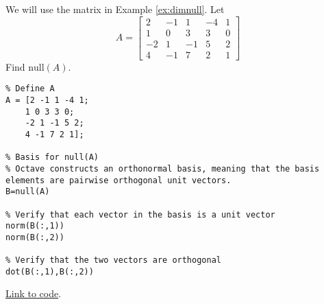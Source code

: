 \documentclass{ximera}
\begin{document}
\begin{template}
    We will use the matrix in Example \ref{ex:dimnull}.  Let 
$$A=\begin{bmatrix}2&-1&1&-4&1\\1&0&3&3&0\\-2&1&-1&5&2\\4&-1&7&2&1\end{bmatrix}$$
Find $\mbox{null}(A)$.

\begin{verbatim}
% Define A
A = [2 -1 1 -4 1;
    1 0 3 3 0;
    -2 1 -1 5 2;
    4 -1 7 2 1];

% Basis for null(A)
% Octave constructs an orthonormal basis, meaning that the basis elements are pairwise orthogonal unit vectors.
B=null(A)

% Verify that each vector in the basis is a unit vector
norm(B(:,1))
norm(B(:,2))

% Verify that the two vectors are orthogonal
dot(B(:,1),B(:,2))
\end{verbatim}

\href{https://sagecell.sagemath.org/?z=eJxtjkFLxDAUhO-B_Ie5LLTQyqauLCh7aPHuzYt4iPV1G2hfJEl38d-b2Kg9mITAm2S-mR0eaTBMaKVoccJLg1pBoT5APUiBuBT2uI17n-e6Se8Kd2iyckjjEVF_jYoUO3TaG4_BOvAyTUVbJvGpD_pC6C374JY-eGiGdWG0bN2sJ7wlV4WZNBs-I4w6xItWHTTRTJxcjvChjbsaT6v_bDnaFzYBF-qDdf5Giu70m53Sn8mZ4XOFku7H_BOGNxnx6C1HilSt6Ir7SpXlZmrKf7CJE672p8N30b9-UrzbkFFVZnwBTjpvrw==&lang=octave&interacts=eJyLjgUAARUAuQ==}{Link to code}.
\end{template}
\end{document}
